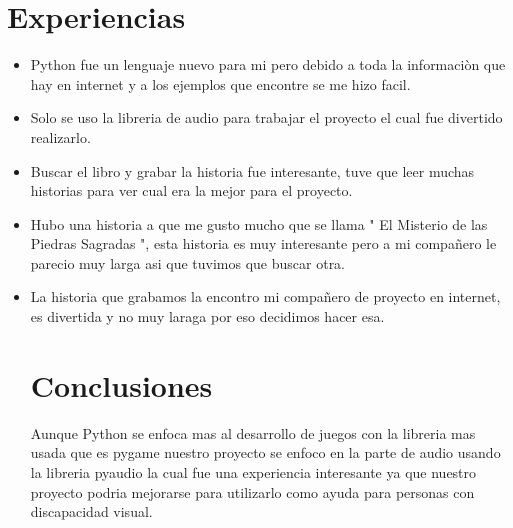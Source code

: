 \section{ Experiencias}
\begin{itemize}
\item Python fue un lenguaje nuevo para mi pero debido a toda la informaciòn que hay en internet y a los ejemplos que encontre se me hizo facil. 
\item Solo se uso la libreria de audio para trabajar el proyecto el cual fue divertido realizarlo.  
\item Buscar el libro y grabar la historia fue interesante, tuve que leer muchas historias para ver cual era la mejor para el proyecto.
\item Hubo una historia a que me gusto mucho que se llama " El Misterio de las Piedras Sagradas ", esta historia es muy interesante pero a mi compañero le parecio muy larga asi que tuvimos que buscar otra.
\item La historia que grabamos la encontro mi compañero de proyecto en internet, es divertida y no muy laraga por eso decidimos hacer esa.
 \section{ Conclusiones} 
 Aunque Python se enfoca mas al desarrollo de juegos con la libreria mas usada que es pygame nuestro proyecto se enfoco en la parte de audio usando la libreria pyaudio la cual fue una experiencia interesante ya que nuestro proyecto podria mejorarse para utilizarlo como ayuda para personas con discapacidad visual.
\end{itemize}


